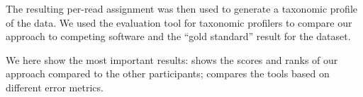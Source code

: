 The resulting per-read assignment was then used to generate a taxonomic profile of the data.
We used the  evaluation tool for taxonomic profilers  \cite{Sczyrba2017}
to compare our approach to competing software and the ``gold standard'' result for the dataset.

We here show the most important  results:
 shows the scores and ranks of our approach compared to the other  participants;
 compares the tools based on different error metrics.%

